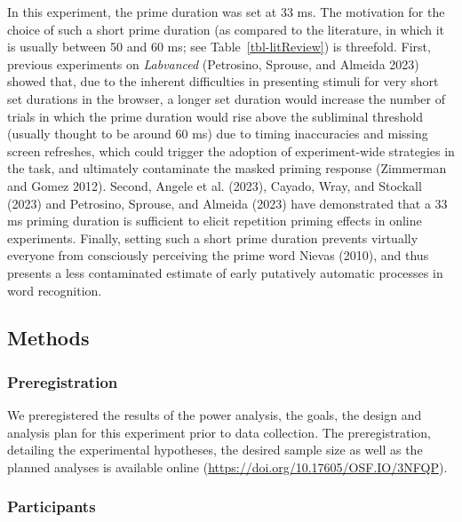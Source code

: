 \documentclass[
]{interact}
\begin{document}
In this experiment, the prime duration was set at 33 ms. The motivation
for the choice of such a short prime duration (as compared to the
literature, in which it is usually between 50 and 60 ms; see
Table~\ref{tbl-litReview}) is threefold. First, previous experiments on
\emph{Labvanced} (Petrosino, Sprouse, and Almeida 2023) showed that, due
to the inherent difficulties in presenting stimuli for very short set
durations in the browser, a longer set duration would increase the
number of trials in which the prime duration would rise above the
subliminal threshold (usually thought to be around 60 ms) due to timing
inaccuracies and missing screen refreshes, which could trigger the
adoption of experiment-wide strategies in the task, and ultimately
contaminate the masked priming response (Zimmerman and Gomez 2012).
Second, Angele et al. (2023), Cayado, Wray, and Stockall (2023) and
Petrosino, Sprouse, and Almeida (2023) have demonstrated that a 33 ms
priming duration is sufficient to elicit repetition priming effects in
online experiments. Finally, setting such a short prime duration
prevents virtually everyone from consciously perceiving the prime word
Nievas (2010), and thus presents a less contaminated estimate of early
putatively automatic processes in word recognition.

\subsection{Methods}\label{sec-exp1-methods}

\subsubsection{Preregistration}\label{sec-exp1-prereg}

We preregistered the results of the power analysis, the goals, the
design and analysis plan for this experiment prior to data collection.
The preregistration, detailing the experimental hypotheses, the desired
sample size as well as the planned analyses is available online
(\url{https://doi.org/10.17605/OSF.IO/3NFQP}).

\subsubsection{Participants}\label{sec-exp1-methods-participants}
\end{document}

